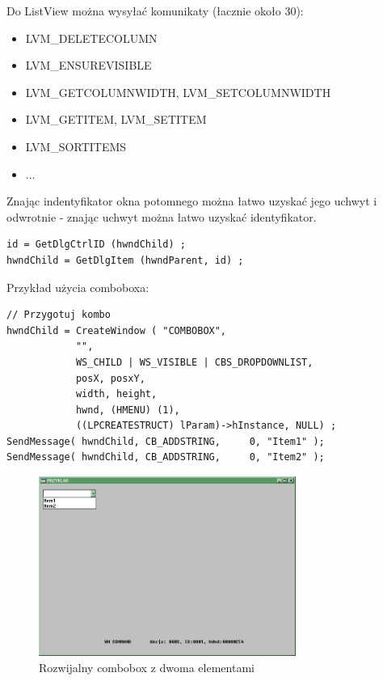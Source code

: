 Do ListView można wysyłać komunikaty (łacznie około 30):
\begin{itemize}
	\item LVM\_DELETECOLUMN
	\item LVM\_ENSUREVISIBLE
	\item LVM\_GETCOLUMNWIDTH, LVM\_SETCOLUMNWIDTH
	\item LVM\_GETITEM, LVM\_SETITEM
	\item LVM\_SORTITEMS
	\item $\ldots$
\end{itemize}

Znając indentyfikator okna potomnego można łatwo uzyskać jego uchwyt i odwrotnie - znając
uchwyt można łatwo uzyskać identyfikator.

\begin{scriptsize}
\begin{verbatim}
id = GetDlgCtrlID (hwndChild) ;
hwndChild = GetDlgItem (hwndParent, id) ;
\end{verbatim}
\end{scriptsize}

Przykład użycia comboboxa:

\begin{scriptsize}
\begin{verbatim}
// Przygotuj kombo                   
hwndChild = CreateWindow ( "COMBOBOX", 
            "",
            WS_CHILD | WS_VISIBLE | CBS_DROPDOWNLIST,
            posX, posxY,
            width, height,
            hwnd, (HMENU) (1),
            ((LPCREATESTRUCT) lParam)->hInstance, NULL) ;
SendMessage( hwndChild, CB_ADDSTRING,     0, "Item1" );
SendMessage( hwndChild, CB_ADDSTRING,     0, "Item2" );
\end{verbatim}
\end{scriptsize}

\begin{figure}
\begin{center}
\includegraphics[width=0.75\textwidth]{./pic/p02}
\caption{Rozwijalny combobox z dwoma elementami}
\end{center}
\end{figure}


